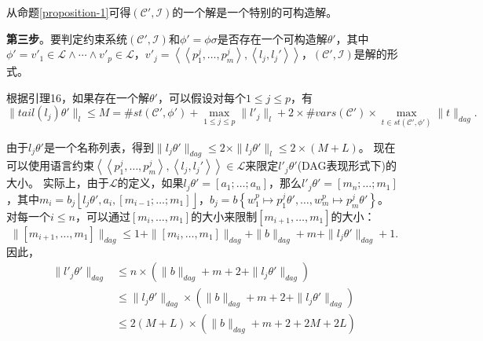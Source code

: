 从命题\ref{proposition-1}可得$(\mathcal{C'},\mathcal{I})$的一个解是一个特别的可构造解。

\textbf{第三步}。要判定约束系统$(\mathcal{C'},\mathcal{I})$和$\phi'=\phi\sigma$是否存在一个可构造解$\theta'$，其中$\phi'=v'_{1}\in \mathcal{L}\land\cdots\land v'_{p}\in \mathcal{L}$，$v'_{j}=\left\langle \left\langle p_{1}^{j},\ldots,p_{m}^{j}\right\rangle ,\left\langle l_{j},l_{j}'\right\rangle \right\rangle $，$(\mathcal{C'},\mathcal{I})$是解的形式。

根据引理16，如果存在一个解$\theta'$，可以假设对每个$1\leq j\leq p$，有
\[
\parallel tail(l_{j})\theta'\parallel_{l}\leq M=\#st(\mathcal{C}',\phi')+\underset{1\leq j\leq p}{\max}\parallel l'_{j}\parallel_{l}+2\times\#vars(\mathcal{C}')\times\underset{t\in st(\mathcal{C}',\phi')}{\max}\parallel t\parallel_{dag}.
\]

由于$l_j\theta'$是一个名称列表，得到$\parallel l_{j}\theta'\parallel_{dag}\leq2\times\parallel l{}_{j}\theta'\parallel_{l}\leq2\times(M+L)$。
现在可以使用语言约束$\left\langle \left\langle p_{1}^{j},\ldots,p_{m}^{j}\right\rangle ,\left\langle l_{j},l_{j}'\right\rangle \right\rangle \in \mathcal{L}$来限定$l'_j\theta'$(DAG表现形式下)的大小。
实际上，由于$\mathcal{L}$的定义，如果$l_{j}\theta'=\left[a_{1};\ldots;a_{n}\right]$，那么$l'_{j}\theta'=\left[m_{n};\ldots;m_{1}\right]$，其中$m_{i}=b_{j}\left\lfloor l_{j}\theta',a_{i},\left[m_{i-1};\ldots;m_{1}\right]\right\rfloor $，$b_{j}=b\left\{ w_{1}^{p}\mapsto p_{1}^{j}\theta',\ldots,w_{m}^{p}\mapsto p_{m}^{j}\theta'\right\} $。
对每一个$i\leq n$，可以通过$\left[m_{i},\ldots,m_{1}\right]$的大小来限制$\left[m_{i+1},\ldots,m_{1}\right]$的大小：
\[
\parallel\left[m_{i+1},\ldots,m_{1}\right]\parallel_{dag}\leq1+\parallel\left[m_{i},\ldots,m_{1}\right]\parallel_{dag}+\parallel b\parallel_{dag}+m+\parallel l_{j}\theta'\parallel_{dag}+1.
\]
因此，
\begin{equation}
\begin{split}
\parallel l'_{j}\theta'\parallel_{dag}&\leq n\times(\parallel b\parallel_{dag}+m+2+\parallel l_{j}\theta'\parallel_{dag}) \\
&\leq\parallel l_{j}\theta'\parallel_{dag}\times(\parallel b\parallel_{dag}+m+2+\parallel l_{j}\theta'\parallel_{dag})\\
&\leq2(M+L)\times(\parallel b\parallel_{dag}+m+2+2M+2L)
\end{split}
\end{equation}

